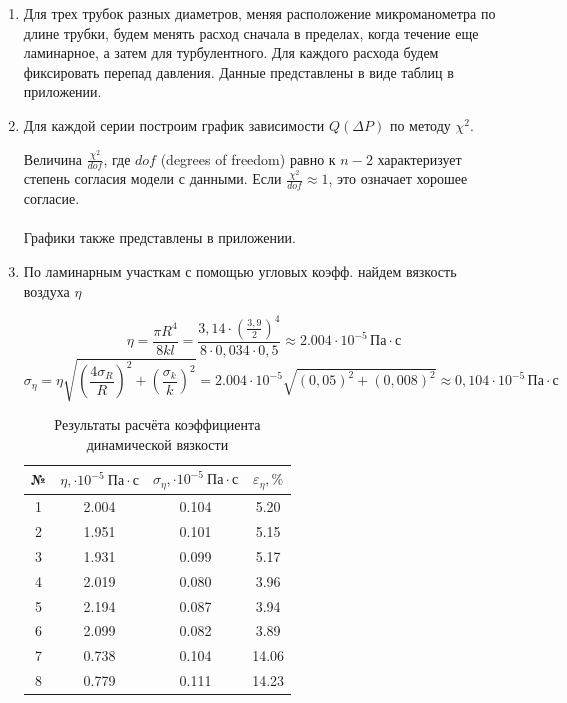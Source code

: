 \documentclass[a4paper,12pt]{article}
\begin{document}
\begin{enumerate}
        \item   Для трех трубок разных диаметров, меняя расположение микроманометра по длине трубки, будем менять расход сначала в пределах, когда течение еще ламинарное, а затем для турбулентного. Для каждого расхода будем фиксировать перепад давления. 
        Данные представлены в виде таблиц в приложении.


        \item   Для каждой серии построим график зависимости $Q(\Delta P)$ по методу $\chi^2$.

    Величина $\frac{\chi^2}{dof}$, где $dof$ (degrees of freedom) равно к $n-2$  характеризует степень согласия модели с данными. Если $\frac{\chi^2}{dof} \approx 1$, это означает хорошее согласие.\\
    \\
    Графики также представлены в приложении.


        \item По ламинарным участкам с помощью угловых коэфф. найдем вязкость воздуха $\eta$

\begin{equation*}
	\eta = \frac{\pi R^4}{8kl} = \frac{3,14 \cdot (\frac{3,9}{2})^4}{8\cdot 0,034 \cdot 0,5} \approx 2.004 \cdot 10^{-5} \, \text{Па} \cdot \text{с}
\end{equation*}
\begin{equation*}
	\sigma_\eta = \eta \sqrt{(\frac{4\sigma_R}{R})^2 + (\frac{\sigma_k}{k})^2} = 2.004 \cdot 10^{-5} \sqrt{(0,05)^2 + (0,008)^2} \approx 0,104 \cdot 10^{-5} \, \text{Па} \cdot \text{с}
\end{equation*}

            \begin{table}[h!]
        \centering
        
        \begin{tabular}{|c|c|c|c|}
        \hline
        № & $\eta, \cdot 10^{-5}~\text{Па} \cdot \text{с}$ & $\sigma_\eta, \cdot 10^{-5}~\text{Па} \cdot \text{с}$ & $\varepsilon_\eta, \%$ \\
        \hline
        1 & 2.004 & 0.104 & 5.20 \\ \hline
        2 & 1.951 & 0.101 & 5.15 \\ \hline
        3 & 1.931 & 0.099 & 5.17 \\ \hline
        4 & 2.019 & 0.080 & 3.96 \\ \hline
        5 & 2.194 & 0.087 & 3.94 \\ \hline
        6 & 2.099 & 0.082 & 3.89 \\ \hline
        7 & 0.738 & 0.104 & 14.06 \\ \hline
        8 & 0.779 & 0.111 & 14.23 \\ \hline
        \end{tabular}
        \caption{Результаты расчёта коэффициента динамической вязкости}
        \end{table}


\end{enumerate}
\end{document}
